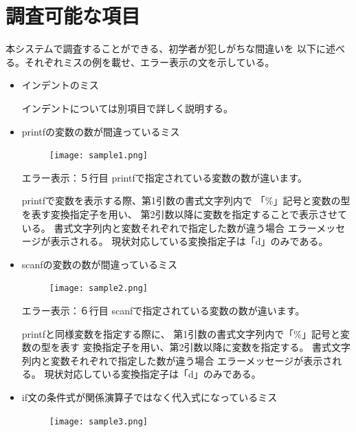 \documentclass{csspaper}
\begin{document}
      \section{調査可能な項目}
      本システムで調査することができる、初学者が犯しがちな間違いを
      以下に述べる。それぞれミスの例を載せ、エラー表示の文を示している。
      \begin{itemize}
         \item インデントのミス
         
         インデントについては別項目で詳しく説明する。

         \item printfの変数の数が間違っているミス
         
         \begin{figure}[h]
            \centering
            \texttt{[image: sample1.png]}
         \end{figure}

         エラー表示：５行目 printfで指定されている変数の数が違います。

         printfで変数を表示する際、第1引数の書式文字列内で
         「\%」記号と変数の型を表す変換指定子を用い、
         第2引数以降に変数を指定することで表示させている。
         書式文字列内と変数それぞれで指定した数が違う場合
         エラーメッセージが表示される。
         現状対応している変換指定子は「d」のみである。

         \item scanfの変数の数が間違っているミス
         
         \begin{figure}[htbp]
            \centering
            \texttt{[image: sample2.png]}
         \end{figure}

         エラー表示：６行目 scanfで指定されている変数の数が違います。

         printfと同様変数を指定する際に、
         第1引数の書式文字列内で「\%」記号と変数の型を表す
         変換指定子を用い、第2引数以降に変数を指定する。
         書式文字列内と変数それぞれで指定した数が違う場合
         エラーメッセージが表示される。
         現状対応している変換指定子は「d」のみである。

         \item if文の条件式が関係演算子ではなく代入式になっているミス
         
         \begin{figure}[h]
            \centering
            \texttt{[image: sample3.png]}
         \end{figure}


\end{itemize}
\end{document}
